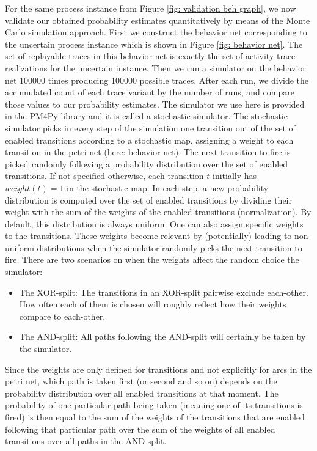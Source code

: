 %
%
%
%
%
%
For the same process instance from Figure \ref{fig: validation beh graph}, we now validate our obtained probability estimates quantitatively by means of the Monte Carlo simulation approach.
First we construct the behavior net corresponding to the uncertain process instance which is shown in Figure \ref{fig: behavior net}.
The set of replayable traces in this behavior net is exactly the set of activity trace realizations for the uncertain instance.
Then we run a simulator on the behavior net 100000 times producing 100000 possible traces.
After each run, we divide the accumulated count of each trace variant by the number of runs, and compare those values to our probability estimates.
The simulator we use here is provided in the PM4Py library and it is called a stochastic simulator.
The stochastic simulator picks in every step of the simulation one transition out of the set of enabled transitions according to a stochastic map, assigning a weight to each transition in the petri net (here: behavior net). 
The next transition to fire is picked randomly following a probability distribution over the set of enabled transitions. 
If not specified otherwise, each transition $t$ initially has $weight(t)=1$ in the stochastic map. 
In each step, a new probability distribution is computed over the set of enabled transitions by dividing their weight with the sum of the weights of the enabled transitions (normalization). 
By default, this distribution is always uniform. 
One can also assign specific weights to the transitions. 
These weights become relevant by (potentially) leading to non-uniform distributions when the simulator randomly picks the next transition to fire. 
There are two scenarios on when the weights affect the random choice the simulator: 
\begin{itemize}
\item The XOR-split:
The transitions in an XOR-split pairwise exclude each-other. 
How often each of them is chosen will roughly reflect how their weights compare to each-other.
\item The AND-split:
All paths following the AND-split will certainly be taken by the simulator. 
\end{itemize}
Since the weights are only defined for transitions and not explicitly for arcs in the petri net, which path is taken first (or second and so on) depends on the probability distribution over all enabled transitions at that moment. 
The probability of one particular path being taken (meaning one of its transitions is fired) is then equal to the sum of the weights of the transitions that are enabled following that particular path over the sum of the weights of all enabled transitions over all paths in the AND-split.\\
